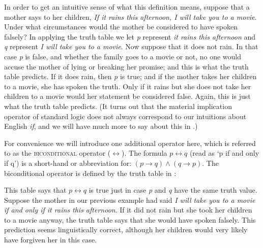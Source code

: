 In order to get an intuitive sense of what this definition means, suppose that a mother says to her children, \textit{If it rains this afternoon, I will take you to a movie}. Under what circumstances would the mother be considered to have spoken falsely? In applying the truth table we let \textit{p} represent \textit{it rains this afternoon} and \textit{q} represent \textit{I will take you to a movie}. Now suppose that it does not rain. In that case \textit{p} is false, and whether the family goes to a movie or not, no one would accuse the mother of lying or breaking her promise; and this is what the truth table predicts. If it does rain, then \textit{p} is true; and if the mother takes her children to a movie, she has spoken the truth. Only if it rains but she does not take her children to a movie would her statement be considered false. Again, this is just what the truth table predicts. (It turns out that the material implication operator of standard logic does not always correspond to our intuitions about English \textit{if}, and we will have much more to say about this in .)



For convenience we will introduce one additional operator here, which is referred to as the \textsc{biconditional} operator ($\leftrightarrow$). The formula $p\leftrightarrow q$ (read as ‘p if and only if q’) is a short-hand or abbreviation for: $(p\rightarrow q) \wedge (q \rightarrow p)$. The biconditional operator is defined by the truth table in :



This table says that $p\leftrightarrow q$ is true just in case \textit{p} and \textit{q} have the same truth value. Suppose the mother in our previous example had said \textit{I will take you to a movie if and only if it rains this afternoon}. If it did not rain but she took her children to a movie anyway, the truth table says that she would have spoken falsely. This prediction seems linguistically correct, although her children would very likely have forgiven her in this case.



